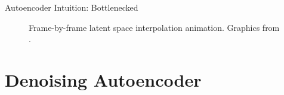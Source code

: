 \begin{frame}{Autoencoder Intuition: Bottlenecked}

\begin{figure}

\begin{columns}
\begin{column}{0.4\textwidth}
\caption{
Frame-by-frame latent space interpolation animation.
Graphics from \cite{white2016sampling}.
}
\end{column}
\end{columns}

\end{figure}

\end{frame}

\section{Denoising Autoencoder}

